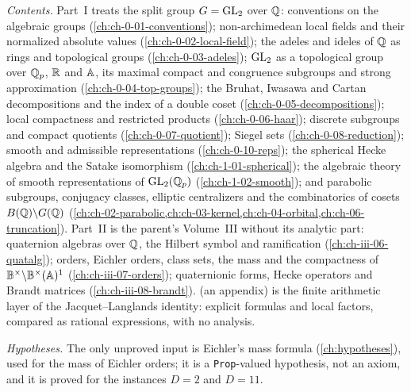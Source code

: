 \noindent\emph{Contents.} Part~I treats the split group $G=\mathrm{GL}_2$ over $\mathbb{Q}$: conventions on the algebraic groups
(\cref{ch:ch-0-01-conventions}); non-archimedean local fields and their normalized absolute values
(\cref{ch:ch-0-02-local-field}); the adeles and ideles of $\mathbb{Q}$ as rings and topological groups
(\cref{ch:ch-0-03-adeles}); $\mathrm{GL}_2$ as a topological group over $\mathbb{Q}_p$, $\mathbb{R}$ and $\mathbb{A}$, its maximal compact and
congruence subgroups and strong approximation (\cref{ch:ch-0-04-top-groups}); the Bruhat, Iwasawa and Cartan
decompositions and the index of a double coset (\cref{ch:ch-0-05-decompositions}); local compactness and restricted products (\cref{ch:ch-0-06-haar}); discrete subgroups and compact
quotients (\cref{ch:ch-0-07-quotient}); Siegel sets (\cref{ch:ch-0-08-reduction}); smooth and admissible representations (\cref{ch:ch-0-10-reps}); the spherical Hecke algebra and
the Satake isomorphism (\cref{ch:ch-1-01-spherical}); the algebraic theory of smooth representations of $\mathrm{GL}_2(\mathbb{Q}_p)$
(\cref{ch:ch-1-02-smooth}); and parabolic subgroups, conjugacy classes, elliptic centralizers and the combinatorics of
cosets $B(\mathbb{Q})\backslash G(\mathbb{Q})$ (\cref{ch:ch-02-parabolic,ch:ch-03-kernel,ch:ch-04-orbital,ch:ch-06-truncation}).
Part~II is the parent's Volume~III without its analytic part: quaternion algebras over $\mathbb{Q}$, the Hilbert symbol and
ramification (\cref{ch:ch-iii-06-quatalg}); orders, Eichler orders, class sets, the mass and the compactness of
$\mathbb{B}^\times\backslash\mathbb{B}^\times(\mathbb{A})^1$ (\cref{ch:ch-iii-07-orders}); quaternionic forms, Hecke operators and Brandt
matrices (\cref{ch:ch-iii-08-brandt}).  (an appendix) is the finite arithmetic layer of
the Jacquet--Langlands identity: explicit formulas and local factors, compared as rational expressions, with no
analysis.

\noindent\emph{Hypotheses.} The only unproved input is Eichler's mass formula (\cref{ch:hypotheses}), used for the
mass of Eichler orders; it is a \texttt{Prop}-valued hypothesis, not an axiom, and it is proved for the instances
$D=2$ and $D=11$.

